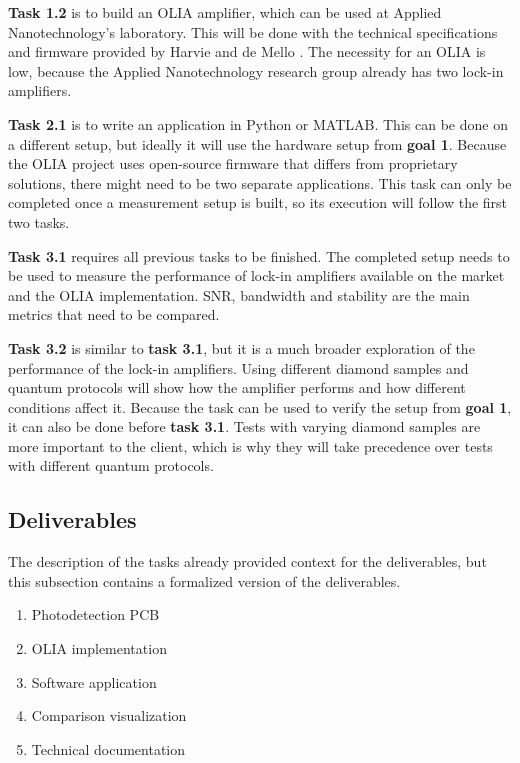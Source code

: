 \documentclass{report}
\begin{document}
	\textbf{Task 1.2} is to build an OLIA amplifier, which can be used at Applied Nanotechnology's laboratory. This will be done with the technical specifications and firmware provided by Harvie and de Mello \cite{harvie2023olia}. The necessity for an OLIA is low, because the Applied Nanotechnology research group already has two lock-in amplifiers.
	
	\textbf{Task 2.1} is to write an application in Python or MATLAB. This can be done on a different setup, but ideally it will use the hardware setup from \textbf{goal 1}. Because the OLIA project uses open-source firmware that differs from proprietary solutions, there might need to be two separate applications. This task can only be completed once a measurement setup is built, so its execution will follow the first two tasks.
	
	
	\textbf{Task 3.1} requires all previous tasks to be finished. The completed setup needs to be used to measure the performance of lock-in amplifiers available on the market and the OLIA implementation. SNR, bandwidth and stability are the main metrics that need to be compared.
	
	\textbf{Task 3.2} is similar to \textbf{task 3.1}, but it is a much broader exploration of the performance of the lock-in amplifiers. Using different diamond samples and quantum protocols will show how the amplifier performs and how different conditions affect it. Because the task can be used to verify the setup from \textbf{goal 1}, it can also be done before \textbf{task 3.1}. Tests with varying diamond samples are more important to the client, which is why they will take precedence over tests with different quantum protocols.
	
	
	\subsection{Deliverables}
	The description of the tasks already provided context for the deliverables, but this subsection contains a formalized version of the deliverables.
	
	\begin{enumerate}
		\item Photodetection PCB 
		\item OLIA implementation
		\item Software application
		\item Comparison visualization
		\item Technical documentation
	\end{enumerate}
	
\end{document}
